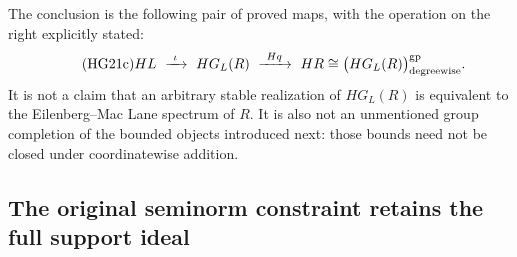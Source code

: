 The conclusion is the following pair of proved maps, with the
operation on the right explicitly stated:
\begin{equation}\tag{HG21c}
 HL\ \xrightarrow{\ \iota\ }\ HG_L(R)
 \ \xrightarrow{\ Hq\ }\ HR
       \cong \bigl(HG_L(R)\bigr)^{\rm gp}_{\rm degreewise}.
\end{equation}
It is not a claim that an arbitrary stable realization of
$HG_L(R)$ is equivalent to the Eilenberg--Mac Lane spectrum
of $R$.  It is also not an unmentioned group completion of
the bounded objects introduced next: those bounds need not
be closed under coordinatewise addition.

\subsection{The original seminorm constraint retains the full support ideal}

